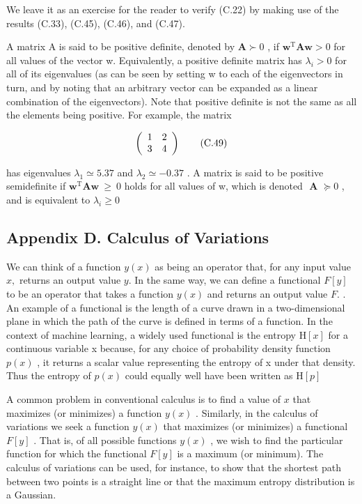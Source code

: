 \documentclass[
  10
]{article}
\begin{document}
We leave it as an exercise for the reader to verify (C.22) by making use
of the results (C.33), (C.45), (C.46), and (C.47).

A matrix A is said to be positive definite, denoted by
\(\mathbf A \succ 0\) , if
\(\mathbf { w } ^ { \mathrm { T } } \mathbf { A } \mathbf { w } > 0\)
for all values of the vector w. Equivalently, a positive definite matrix
has \(\lambda _ { i } > 0\) for all of its eigenvalues (as can be seen
by setting w to each of the eigenvectors in turn, and by noting that an
arbitrary vector can be expanded as a linear combination of the
eigenvectors). Note that positive definite is not the same as all the
elements being positive. For example, the matrix

\[
\left( \begin{array}{c c} 1 & 2 \\ 3 & 4 \end{array} \right)\tag{C.49}
\]

has eigenvalues \(\lambda _ { 1 } \simeq 5 . 3 7\) and
\(\lambda _ { 2 } \simeq - 0 . 3 7\) . A matrix is said to be positive
semidefinite if
\(\mathbf { w } ^ { \mathrm { T } } \mathbf { A } \mathbf { w } \ \geqslant \ 0\)
holds for all values of w, which is denoted \(\textbf { A } \succeq 0\)
, and is equivalent to \(\lambda _ { i } \geqslant 0\)

\subsection{Appendix D. Calculus of
Variations}\label{appendix-d.-calculus-of-variations}

We can think of a function \(y ( x )\) as being an operator that, for
any input value \(x ,\) returns an output value \(y .\) In the same way,
we can define a functional \(F [ y ]\) to be an operator that takes a
function \(y ( x )\) and returns an output value \(F .\) . An example of
a functional is the length of a curve drawn in a two-dimensional plane
in which the path of the curve is defined in terms of a function. In the
context of machine learning, a widely used functional is the entropy
\(\mathrm { H } [ x ]\) for a continuous variable x because, for any
choice of probability density function \(p ( x )\) , it returns a scalar
value representing the entropy of x under that density. Thus the entropy
of \(p ( x )\) could equally well have been written as
\(\mathrm { H } [ p ]\)

A common problem in conventional calculus is to find a value of \(x\)
that maximizes (or minimizes) a function \(y ( x )\) . Similarly, in the
calculus of variations we seek a function \(y ( x )\) that maximizes (or
minimizes) a functional \(F [ y ]\) . That is, of all possible functions
\(y ( x )\) , we wish to find the particular function for which the
functional \(F [ y ]\) is a maximum (or minimum). The calculus of
variations can be used, for instance, to show that the shortest path
between two points is a straight line or that the maximum entropy
distribution is a Gaussian.
\end{document}
